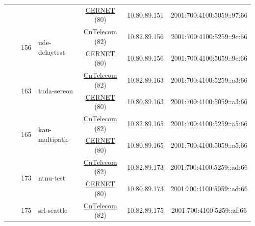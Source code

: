 \begin{small}
\begin{center}
\begin{longtable}{|c|c|c|c|c|c|c|c|}
  &  &  &  & \multicolumn{2}{|c|}{\tiny{\href{http://www.cernet.edu.cn}{CERNET} (80)}} & \tiny{10.80.89.151} & \tiny{2001:700:4100:5059::97:66} \\* \cline{3-3}\cline{4-4}\cline{5-5}\cline{6-6}\cline{7-7}\cline{8-8}
  &  & \multirow{2}{*}{\tiny{156}} & \multicolumn{1}{|l|}{\multirow{2}{*}{\tiny{ude-delaytest}}} & \multicolumn{2}{|c|}{\tiny{\href{http://www.chinatelecom.com.cn}{CnTelecom} (82)}} & \tiny{10.82.89.156} & \tiny{2001:700:4100:5259::9c:66} \\* \cline{5-5}\cline{6-6}\cline{7-7}\cline{8-8}
  &  &  &  & \multicolumn{2}{|c|}{\tiny{\href{http://www.cernet.edu.cn}{CERNET} (80)}} & \tiny{10.80.89.156} & \tiny{2001:700:4100:5059::9c:66} \\* \cline{3-3}\cline{4-4}\cline{5-5}\cline{6-6}\cline{7-7}\cline{8-8}
  &  & \multirow{2}{*}{\tiny{163}} & \multicolumn{1}{|l|}{\multirow{2}{*}{\tiny{tuda-sereon}}} & \multicolumn{2}{|c|}{\tiny{\href{http://www.chinatelecom.com.cn}{CnTelecom} (82)}} & \tiny{10.82.89.163} & \tiny{2001:700:4100:5259::a3:66} \\* \cline{5-5}\cline{6-6}\cline{7-7}\cline{8-8}
  &  &  &  & \multicolumn{2}{|c|}{\tiny{\href{http://www.cernet.edu.cn}{CERNET} (80)}} & \tiny{10.80.89.163} & \tiny{2001:700:4100:5059::a3:66} \\* \cline{3-3}\cline{4-4}\cline{5-5}\cline{6-6}\cline{7-7}\cline{8-8}
  &  & \multirow{2}{*}{\tiny{165}} & \multicolumn{1}{|l|}{\multirow{2}{*}{\tiny{kau-multipath}}} & \multicolumn{2}{|c|}{\tiny{\href{http://www.chinatelecom.com.cn}{CnTelecom} (82)}} & \tiny{10.82.89.165} & \tiny{2001:700:4100:5259::a5:66} \\* \cline{5-5}\cline{6-6}\cline{7-7}\cline{8-8}
  &  &  &  & \multicolumn{2}{|c|}{\tiny{\href{http://www.cernet.edu.cn}{CERNET} (80)}} & \tiny{10.80.89.165} & \tiny{2001:700:4100:5059::a5:66} \\* \cline{3-3}\cline{4-4}\cline{5-5}\cline{6-6}\cline{7-7}\cline{8-8}
  &  & \multirow{2}{*}{\tiny{173}} & \multicolumn{1}{|l|}{\multirow{2}{*}{\tiny{ntnu-test}}} & \multicolumn{2}{|c|}{\tiny{\href{http://www.chinatelecom.com.cn}{CnTelecom} (82)}} & \tiny{10.82.89.173} & \tiny{2001:700:4100:5259::ad:66} \\* \cline{5-5}\cline{6-6}\cline{7-7}\cline{8-8}
  &  &  &  & \multicolumn{2}{|c|}{\tiny{\href{http://www.cernet.edu.cn}{CERNET} (80)}} & \tiny{10.80.89.173} & \tiny{2001:700:4100:5059::ad:66} \\* \cline{3-3}\cline{4-4}\cline{5-5}\cline{6-6}\cline{7-7}\cline{8-8}
  &  & \multirow{2}{*}{\tiny{175}} & \multicolumn{1}{|l|}{\multirow{2}{*}{\tiny{srl-seattle}}} & \multicolumn{2}{|c|}{\tiny{\href{http://www.chinatelecom.com.cn}{CnTelecom} (82)}} & \tiny{10.82.89.175} & \tiny{2001:700:4100:5259::af:66} \\* \cline{5-5}\cline{6-6}\cline{7-7}\cline{8-8}

\end{longtable}
\end{center}
\end{small}
